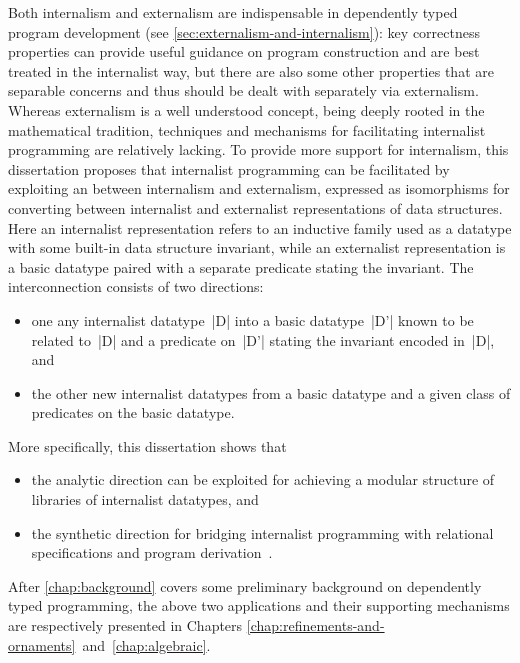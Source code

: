 Both internalism and externalism are indispensable in dependently typed program development (see \autoref{sec:externalism-and-internalism}): key correctness properties can provide useful guidance on program construction and are best treated in the internalist way, but there are also some other properties that are separable concerns and thus should be dealt with separately via externalism.
Whereas externalism is a well understood concept, being deeply rooted in the mathematical tradition, techniques and mechanisms for facilitating internalist programming are relatively lacking.
To provide more support for internalism, this dissertation proposes that internalist programming can be facilitated by exploiting an  between internalism and externalism, expressed as isomorphisms for converting between internalist and externalist representations of data structures.
Here an internalist representation refers to an inductive family used as a datatype with some built-in data structure invariant, while an externalist representation is a basic datatype paired with a separate predicate stating the invariant.
The interconnection consists of two directions:
\begin{itemize}
\item one  any internalist datatype~|D| into a basic datatype~|D'| known to be related to~|D| and a predicate on~|D'| stating the invariant encoded in~|D|, and
\item the other  new internalist datatypes from a basic datatype and a given class of predicates on the basic datatype.
\end{itemize}
More specifically, this dissertation shows that
\begin{itemize}
\item the analytic direction can be exploited for achieving a modular structure of libraries of internalist datatypes, and
\item the synthetic direction for bridging internalist programming with relational specifications and program derivation~\citep{Bird-AoP}.
\end{itemize}
After \autoref{chap:background} covers some preliminary background on dependently typed programming, the above two applications and their supporting mechanisms are respectively presented in Chapters \ref{chap:refinements-and-ornaments}~and~\ref{chap:algebraic}.
